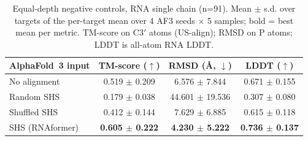 \begin{table}[htbp]
\centering
\caption{Equal-depth negative controls, RNA single chain (n=91). Mean $\pm$ s.d. over targets of the per-target mean over 4 AF3 seeds $\times$ 5 samples; bold = best mean per metric. TM-score on C3$'$ atoms (US-align); RMSD on P atoms; LDDT is all-atom RNA LDDT.}
\label{tab:rna_single_chain_shuffle}
\begin{tabular}{lccc}
\toprule
AlphaFold~3 input & TM-score ($\uparrow$) & RMSD (\AA, $\downarrow$) & LDDT ($\uparrow$) \\
\midrule
No alignment & 0.519 $\pm$ 0.209 & 6.576 $\pm$ 7.844 & 0.671 $\pm$ 0.155 \\
Random SHS & 0.179 $\pm$ 0.038 & 44.601 $\pm$ 19.536 & 0.307 $\pm$ 0.080 \\
Shuffled SHS & 0.412 $\pm$ 0.144 & 7.629 $\pm$ 6.885 & 0.615 $\pm$ 0.118 \\
SHS (RNAformer) & \textbf{0.605 $\pm$ 0.222} & \textbf{4.230 $\pm$ 5.222} & \textbf{0.736 $\pm$ 0.137} \\
\bottomrule
\end{tabular}
\end{table}
